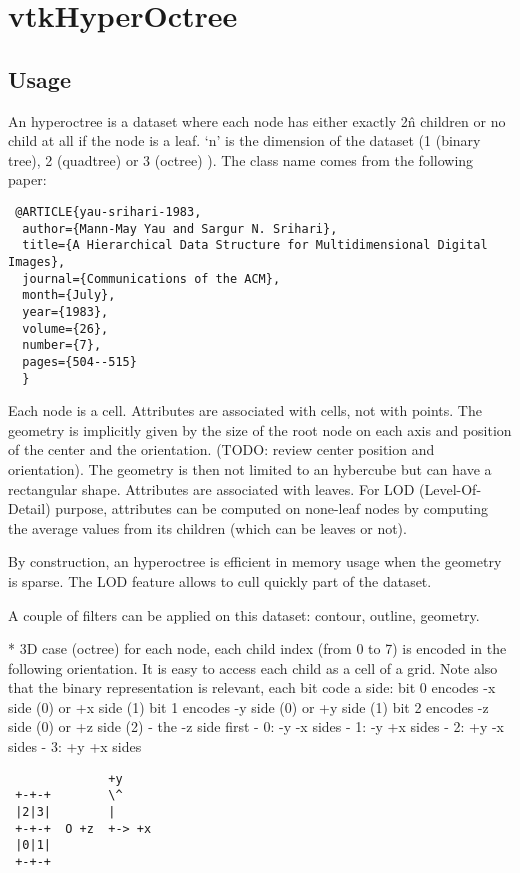 \section{vtkHyperOctree}

\subsection{Usage}

 An hyperoctree is a dataset where each node has either exactly 2\^n children
 or no child at all if the node is a leaf. `n' is the dimension of the
 dataset (1 (binary tree), 2 (quadtree) or 3 (octree) ).
 The class name comes from the following paper:

 \begin{verbatim}
 @ARTICLE{yau-srihari-1983,
  author={Mann-May Yau and Sargur N. Srihari},
  title={A Hierarchical Data Structure for Multidimensional Digital Images},
  journal={Communications of the ACM},
  month={July},
  year={1983},
  volume={26},
  number={7},
  pages={504--515}
  }
 \end{verbatim}

 Each node is a cell. Attributes are associated with cells, not with points.
 The geometry is implicitly given by the size of the root node on each axis
 and position of the center and the orientation. (TODO: review center
 position and orientation). The geometry is then not limited to an hybercube
 but can have a rectangular shape.
 Attributes are associated with leaves. For LOD (Level-Of-Detail) purpose,
 attributes can be computed on none-leaf nodes by computing the average
 values from its children (which can be leaves or not).

 By construction, an hyperoctree is efficient in memory usage when the
 geometry is sparse. The LOD feature allows to cull quickly part of the
 dataset.

 A couple of filters can be applied on this dataset: contour, outline,
 geometry.

 * 3D case (octree)
 for each node, each child index (from 0 to 7) is encoded in the following
 orientation. It is easy to access each child as a cell of a grid.
 Note also that the binary representation is relevant, each bit code a
 side: bit 0 encodes -x side (0) or +x side (1)
 bit 1 encodes -y side (0) or +y side (1)
 bit 2 encodes -z side (0) or +z side (2)
 - the -z side first
 - 0: -y -x sides
 - 1: -y +x sides
 - 2: +y -x sides
 - 3: +y +x sides
 \begin{verbatim}
              +y
 +-+-+        \^
 |2|3|        |
 +-+-+  O +z  +-> +x
 |0|1|
 +-+-+
 \end{verbatim}

